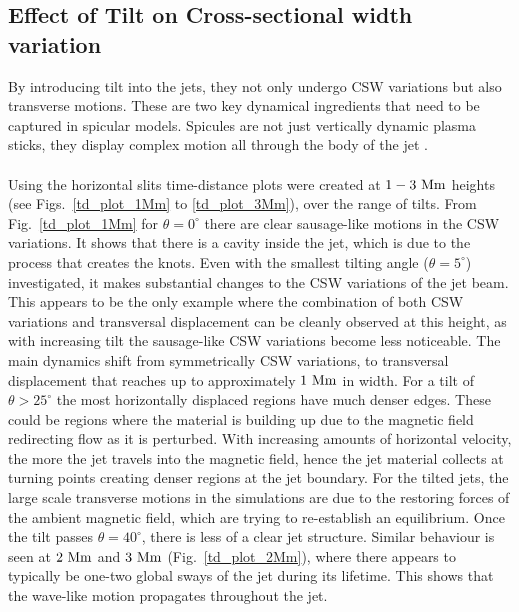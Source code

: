 \documentclass[12pt]{ociamthesis}
\newcommand{\np}{\\ \\}
\newcommand{\degs}{^{\circ}}
\begin{document}
\subsection{Effect of Tilt on Cross-sectional width variation}
\label{subsec:oscillating}
By introducing tilt into the jets, they not only undergo CSW variations but also transverse motions. These are two key dynamical ingredients that need to be captured in spicular models. Spicules are not just vertically dynamic plasma sticks, they display complex motion all through the body of the jet \citep{Sharma2018ApJ85361S}. \np
%
Using the horizontal slits time-distance plots were created at $1-3~\rm{Mm}$ heights (see Figs.~\ref{td_plot_1Mm} to \ref{td_plot_3Mm}), over the range of tilts. From Fig.~\ref{td_plot_1Mm} for $\theta=0^{\circ}$ there are clear sausage-like motions in the CSW variations. It shows that there is a cavity inside the jet, which is due to the process that creates the knots. Even with the smallest tilting angle ($\theta=5\degs$) investigated, it makes substantial changes to the CSW variations of the jet beam. This appears to be the only example where the combination of both CSW variations and transversal displacement can be cleanly observed at this height, as with increasing tilt the sausage-like CSW variations become less noticeable. The main dynamics shift from symmetrically CSW variations, to transversal displacement that reaches up to approximately $1~\rm{Mm}$ in width. For a tilt of $\theta>25\degs$ the most horizontally displaced regions have much denser edges. These could be regions where the material is building up due to the magnetic field redirecting flow as it is perturbed. With increasing amounts of horizontal velocity, the more the jet travels into the magnetic field, hence the jet material collects at turning points creating denser regions at the jet boundary. For the tilted jets, the large scale transverse motions in the simulations are due to the restoring forces of the ambient magnetic field, which are trying to re-establish an equilibrium. Once the tilt passes $\theta=40\degs$, there is less of a clear jet structure. Similar behaviour is seen at $2~\rm{Mm}$ and $3~\rm{Mm}$ (Fig.~\ref{td_plot_2Mm}), where there appears to typically be one-two global sways of the jet during its lifetime. This shows that the wave-like motion propagates throughout the jet. \np
%
\end{document}
